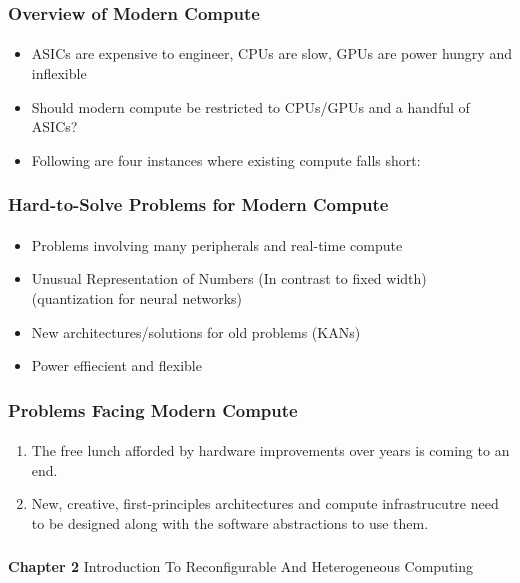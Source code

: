 \documentclass{beamer}
\begin{document}
{\begin{frame}[fragile]
\frametitle{Overview of Modern Compute}
\framesubtitle{}
  \begin{itemize}
    \item ASICs are expensive to engineer, CPUs are slow, GPUs
      are power hungry and inflexible
    \item Should modern compute be restricted to CPUs/GPUs and a handful
      of ASICs?
    \item Following are four instances where existing compute falls short:
  \end{itemize}
\end{frame}

\begin{frame}[fragile]
\frametitle{Hard-to-Solve Problems for Modern Compute}
\framesubtitle{}
  \begin{itemize}
    \item Problems involving many peripherals and real-time compute
    \item Unusual Representation of Numbers (In contrast to fixed width) 
      (quantization for neural networks)
    \item New architectures/solutions for old problems (KANs)
    \item Power effiecient and flexible
  \end{itemize}
\end{frame}

\begin{frame}[fragile]
\frametitle{Problems Facing Modern Compute}
  \framesubtitle{}
  \begin{enumerate}
    \item The free lunch afforded by hardware improvements over years
      is coming to an end.
    \item New, creative, first-principles architectures and
      compute infrastrucutre need to be designed along with the
      software abstractions to use them. 
  \end{enumerate}
\end{frame}

\begin{frame}[c,fragile]
  \frametitle{}

  \centering
  \textbf{Chapter 2}
  \centering
  Introduction To Reconfigurable And Heterogeneous Computing
\end{frame}

}
\end{document}
